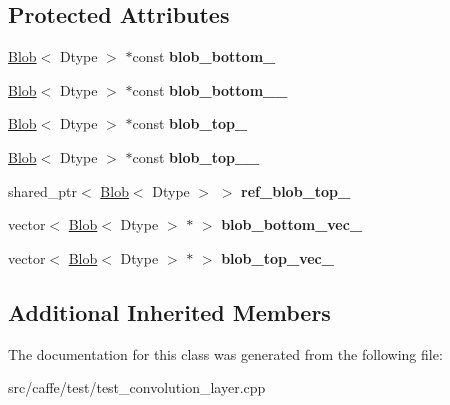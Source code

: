 \subsection*{Protected Attributes}
\begin{DoxyCompactItemize}
\item 
\mbox{\label{classcaffe_1_1_convolution_layer_test_ab33f3dad13aa85aa2a491051b4e63bcb}} 
\mbox{\hyperlink{classcaffe_1_1_blob}{Blob}}$<$ Dtype $>$ $\ast$const {\bfseries blob\+\_\+bottom\+\_\+}
\item 
\mbox{\label{classcaffe_1_1_convolution_layer_test_a54963e2ff0bfada7a3aa6478f0c86115}} 
\mbox{\hyperlink{classcaffe_1_1_blob}{Blob}}$<$ Dtype $>$ $\ast$const {\bfseries blob\+\_\+bottom\+\_\+\_\+}
\item 
\mbox{\label{classcaffe_1_1_convolution_layer_test_abd839b9df60ee973c89ff9663653dfa1}} 
\mbox{\hyperlink{classcaffe_1_1_blob}{Blob}}$<$ Dtype $>$ $\ast$const {\bfseries blob\+\_\+top\+\_\+}
\item 
\mbox{\label{classcaffe_1_1_convolution_layer_test_a6737c93a060b0a33eb3240b07774bd89}} 
\mbox{\hyperlink{classcaffe_1_1_blob}{Blob}}$<$ Dtype $>$ $\ast$const {\bfseries blob\+\_\+top\+\_\+\_\+}
\item 
\mbox{\label{classcaffe_1_1_convolution_layer_test_a1c5ea82a108416173b817fc930bdf019}} 
shared\+\_\+ptr$<$ \mbox{\hyperlink{classcaffe_1_1_blob}{Blob}}$<$ Dtype $>$ $>$ {\bfseries ref\+\_\+blob\+\_\+top\+\_\+}
\item 
\mbox{\label{classcaffe_1_1_convolution_layer_test_a0345849c2510ef9c1f44ab2897266416}} 
vector$<$ \mbox{\hyperlink{classcaffe_1_1_blob}{Blob}}$<$ Dtype $>$ $\ast$ $>$ {\bfseries blob\+\_\+bottom\+\_\+vec\+\_\+}
\item 
\mbox{\label{classcaffe_1_1_convolution_layer_test_a67ca5586803b3334ea1724c9df4eaa44}} 
vector$<$ \mbox{\hyperlink{classcaffe_1_1_blob}{Blob}}$<$ Dtype $>$ $\ast$ $>$ {\bfseries blob\+\_\+top\+\_\+vec\+\_\+}
\end{DoxyCompactItemize}
\subsection*{Additional Inherited Members}


The documentation for this class was generated from the following file\+:\begin{DoxyCompactItemize}
\item 
src/caffe/test/test\+\_\+convolution\+\_\+layer.\+cpp\end{DoxyCompactItemize}
